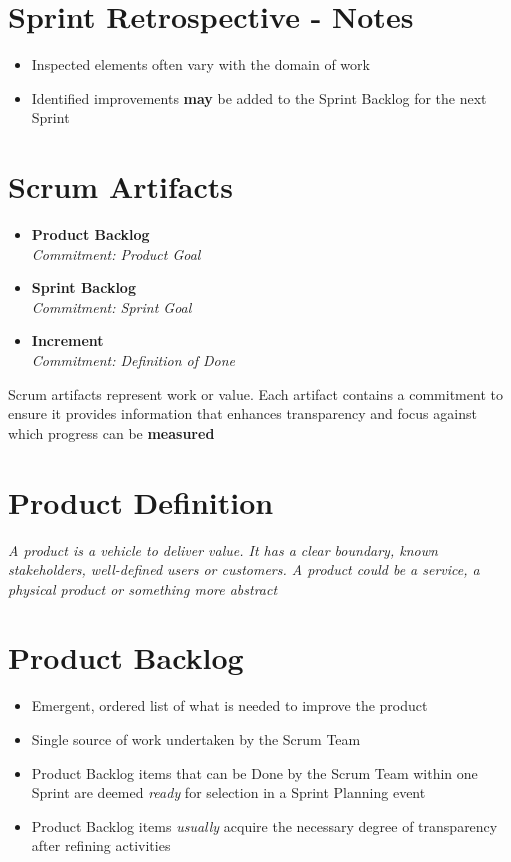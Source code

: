 \documentclass[a4paper,11pt,twocolumn]{article}
\begin{document}
\section*{Sprint Retrospective - Notes}
\begin{itemize}
	\item Inspected elements often vary with the domain of work
	\item Identified improvements \textbf{may} be added to the Sprint Backlog for the next Sprint
\end{itemize}

\section*{Scrum Artifacts}
\begin{itemize}
	\item \textbf{Product Backlog}\\
	\textit{Commitment: Product Goal}
	\item \textbf{Sprint Backlog}\\
	\textit{Commitment: Sprint Goal}
	\item \textbf{Increment}\\
	\textit{Commitment: Definition of Done}
\end{itemize}

\begin{tcolorbox}[colback=black!8!white,colframe=gray!50!black,title=Note,sharp corners,fonttitle=\normalsize\bfseries,fontupper=\normalsize,left=0.7em,right=0.7em]
	Scrum artifacts represent work or value. Each artifact contains a commitment to ensure it provides information that enhances transparency and focus against which progress can be \textbf{measured}
\end{tcolorbox}

\section*{Product Definition}
\textit{A product is a vehicle to deliver value. It has a clear boundary, known stakeholders, well-defined users or customers. A product could be a service, a physical product or something more abstract}

\section*{Product Backlog}
\begin{itemize}
	\item Emergent, ordered list of what is needed to improve the product
	\item Single source of work undertaken by the Scrum Team
	\item Product Backlog items that can be Done by the Scrum Team within one Sprint are deemed \textit{ready} for selection in a Sprint Planning event
	\item Product Backlog items \textit{usually} acquire the necessary degree of transparency after refining activities
\end{itemize}
\end{document}
